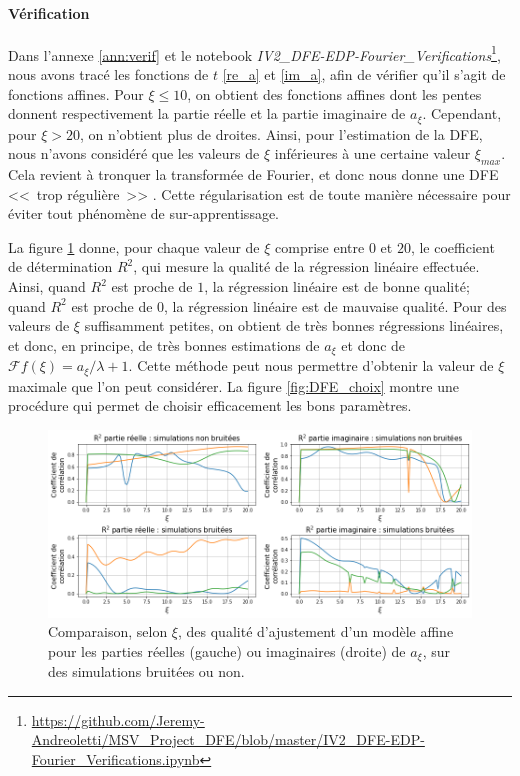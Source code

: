\documentclass[12pt]{article}
\newcommand{\fr}{\mathcal{F}}
\begin{document}
\paragraph{Vérification} Dans l'annexe \ref{ann:verif} et le notebook \emph{IV2\_DFE-EDP-Fourier\_Verifications}\footnote{\url{https://github.com/Jeremy-Andreoletti/MSV_Project_DFE/blob/master/IV2_DFE-EDP-Fourier_Verifications.ipynb}}, nous avons tracé les fonctions de $t$ \eqref{re_a} et \eqref{im_a}, afin de vérifier qu'il s'agit de fonctions affines. Pour $\xi\leqslant 10$, on obtient des fonctions affines dont les pentes donnent respectivement la partie réelle et la partie imaginaire de $a_{\xi}$. Cependant, pour $\xi>20$, on n'obtient plus de droites. Ainsi, pour l'estimation de la DFE, nous n'avons considéré que les valeurs de $\xi$ inférieures à une certaine valeur $\xi_{max}$. Cela revient à tronquer la transformée de Fourier, et donc nous donne une DFE <<~trop régulière~>> . Cette régularisation est de toute manière nécessaire pour éviter tout phénomène de sur-apprentissage.

La figure \ref{fig:DFE_R2} donne, pour chaque valeur de $\xi$ comprise entre $0$ et $20$, le coefficient de détermination $R^2$, qui mesure la qualité de la régression linéaire effectuée. Ainsi, quand $R^2$ est proche de $1$, la régression linéaire est de bonne qualité; quand $R^2$ est proche de $0$, la régression linéaire est de mauvaise qualité. Pour des valeurs de $\xi$ suffisamment petites, on obtient de très bonnes régressions linéaires, et donc, en principe, de très bonnes estimations de $a_{\xi}$ et donc de $\fr f(\xi)=a_{\xi}/\lambda+1$. Cette méthode peut nous permettre d'obtenir la valeur de $\xi$ maximale que l'on peut considérer. La figure \ref{fig:DFE_choix} montre une procédure qui permet de choisir efficacement les bons paramètres.

\begin{figure}[h]
  \begin{center}
    \includegraphics[width=0.9\linewidth]{../Img/DFE_R2.png}
  \end{center}
  \caption{\label{fig:DFE_R2}Comparaison, selon $\xi$, des qualité d'ajustement d'un modèle affine pour les parties réelles (gauche) ou imaginaires (droite) de $a_{\xi}$, sur des simulations bruitées ou non.}
\end{figure}
\end{document}

